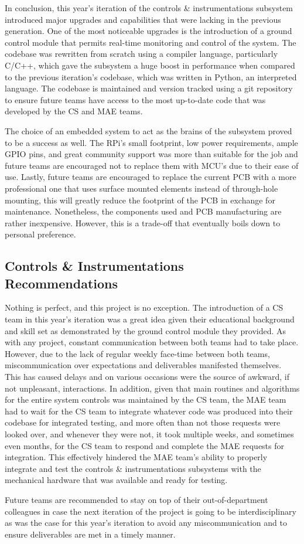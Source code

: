 
\indent\indent In conclusion, this year's iteration of the controls \& instrumentations subsystem introduced major upgrades and capabilities that were lacking in the previous generation. One of the most noticeable upgrades is the introduction of a ground control module that permits real-time monitoring and control of the system. The codebase was rewritten from scratch using a compiler language, particularly C/C++, which gave the subsystem a huge boost in performance when compared to the previous iteration's codebase, which was written in Python, an interpreted language. The codebase is maintained and version tracked using a git repository to ensure future teams have access to the most up-to-date code that was developed by the CS and MAE teams.

The choice of an embedded system to act as the brains of the subsystem proved to be a success as well. The RPi's small footprint, low power requirements, ample GPIO pins, and great community support was more than suitable for the job and future teams are encouraged not to replace them with MCU's due to their ease of use. Lastly, future teams are encouraged to replace the current PCB with a more professional one that uses surface mounted elements instead of through-hole mounting, this will greatly reduce the footprint of the PCB in exchange for maintenance. Nonetheless, the components used and PCB manufacturing are rather inexpensive. However, this is a trade-off that eventually boils down to personal preference.

\subsection*{Controls \& Instrumentations Recommendations}

\indent\indent Nothing is perfect, and this project is no exception. The introduction of a CS team in this year's iteration was a great idea given their educational background and skill set as demonstrated by the ground control module they provided. As with any project, constant communication between both teams had to take place. However, due to the lack of regular weekly face-time between both teams, miscommunication over expectations and deliverables manifested themselves. This has caused delays and on various occasions were the source of awkward, if not unpleasant, interactions. In addition, given that main routines and algorithms for the entire system controls was maintained by the CS team, the MAE team had to wait for the CS team to integrate whatever code was produced into their codebase for integrated testing, and more often than not those requests were looked over, and whenever they were not, it took multiple weeks, and sometimes even months, for the CS team to respond and complete the MAE requests for integration. This effectively hindered  the MAE team's ability to properly integrate and test the controls \& instrumentations subsystems with the mechanical hardware that was available and ready for testing.

Future teams are recommended to stay on top of their out-of-department colleagues in case the next iteration of the project is going to be interdisciplinary as was the case for this year's iteration to avoid any miscommunication and to ensure deliverables are met in a timely manner. 